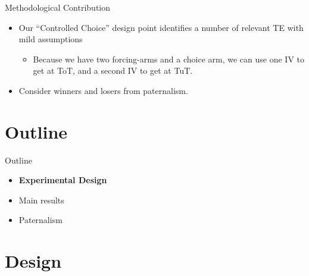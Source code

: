 \documentclass[8pt]{beamer}
\begin{document}
\begin{frame}{Methodological Contribution}
\begin{itemize}
    \vfill \item Our ``Controlled Choice'' design point identifies a number of relevant TE with mild assumptions
    \begin{itemize}
        \item Because we have two forcing-arms and a choice arm, we can use one IV to get at ToT, and a second IV to get at TuT.
    \end{itemize}
    
    
   \vfill  \item Consider winners and losers from paternalism.     

    
  


\end{itemize}
\end{frame}




\section{Outline}
\begin{frame}{Outline}
     \begin{itemize}
         \vfill\item \textbf{Experimental Design}
         \vfill\item Main results
         \vfill\item Paternalism
     \end{itemize}
\end{frame}







\section{Design}
\end{document}
